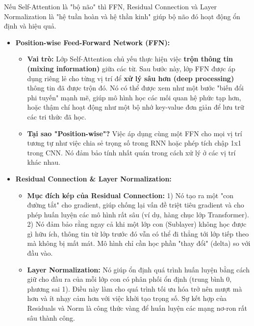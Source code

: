 \begin{tcolorbox}[
    title={Vai trò của các Thành phần Phụ trong Khối Transformer},
    colback=blue!5!white, colframe=blue!50!black, fonttitle=\bfseries
]
Nếu Self-Attention là "bộ não" thì FFN, Residual Connection và Layer Normalization là "hệ tuần hoàn và hệ thần kinh" giúp bộ não đó hoạt động ổn định và hiệu quả.
\begin{itemize}
    \item \textbf{Position-wise Feed-Forward Network (FFN):}
        \begin{itemize}
            \item \textbf{Vai trò:} Lớp Self-Attention chủ yếu thực hiện việc \textbf{trộn thông tin (mixing information)} giữa các từ. Sau bước này, lớp FFN được áp dụng riêng lẻ cho từng vị trí để \textbf{xử lý sâu hơn (deep processing)} thông tin đã được trộn đó. Nó có thể được xem như một bước "biến đổi phi tuyến" mạnh mẽ, giúp mô hình học các mối quan hệ phức tạp hơn, hoặc thậm chí hoạt động như một bộ nhớ key-value đơn giản để lưu trữ các tri thức đã học.
            \item \textbf{Tại sao "Position-wise"?} Việc áp dụng cùng một FFN cho mọi vị trí tương tự như việc chia sẻ trọng số trong RNN hoặc phép tích chập 1x1 trong CNN. Nó đảm bảo tính nhất quán trong cách xử lý ở các vị trí khác nhau.
        \end{itemize}
    \item \textbf{Residual Connection \& Layer Normalization:}
        \begin{itemize}
            \item \textbf{Mục đích kép của Residual Connection:} 1) Nó tạo ra một "con đường tắt" cho gradient, giúp chống lại vấn đề triệt tiêu gradient và cho phép huấn luyện các mô hình rất sâu (ví dụ, hàng chục lớp Transformer). 2) Nó đảm bảo rằng ngay cả khi một lớp con (Sublayer) không học được gì hữu ích, thông tin từ lớp trước đó vẫn có thể đi thẳng tới lớp tiếp theo mà không bị mất mát. Mô hình chỉ cần học phần "thay đổi" (delta) so với đầu vào.
            \item \textbf{Layer Normalization:} Nó giúp ổn định quá trình huấn luyện bằng cách giữ cho đầu ra của mỗi lớp con có phân phối ổn định (trung bình 0, phương sai 1). Điều này làm cho quá trình tối ưu hóa trở nên mượt mà hơn và ít nhạy cảm hơn với việc khởi tạo trọng số. Sự kết hợp của Residuals và Norm là công thức vàng để huấn luyện các mạng nơ-ron rất sâu thành công.
        \end{itemize}
\end{itemize}
\end{tcolorbox}
